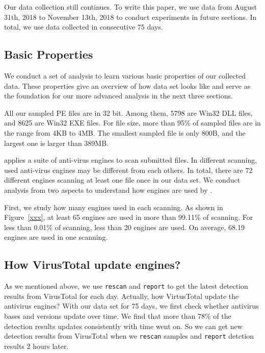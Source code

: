Our data collection still continues. 
To write this paper, we use data from August 31th, 2018 to 
November 13th, 2018 to conduct experiments in future sections. 
In total, we use data collected in consecutive 75 days. 

\subsection{Basic Properties}


We conduct a set of analysis 
to learn various basic properties of our collected data.
These properties give an overview of how data set looks like
and serve as the foundation for our more 
advanced analysis in the next three sections. 

All our sampled PE files are in 32 bit. 
Among them, 5798 are Win32 DLL files, 
and 8625 are Win32 EXE files.
For file size, more than 95\% of sampled files are 
in the range from 4KB to 4MB. 
The smallest sampled file is only 800B, 
and the largest one is larger than 389MB.


\vt{} applies a suite of anti-virus engines to scan submitted files.
In different scanning, used anti-virus engines may be different 
from each others. 
In total, there are 72 different engines scanning 
at least one file once in our data set. 
We conduct analysis from two aspects to 
understand how engines are used by \vt{}.

First, we study how many engines used in each scanning. 
As shown in Figure~\ref{xxx}, at least 65 engines are used in more 
than 99.11\% of scanning. 
For less than 0.01\% of scanning, 
less than 20 engines are used. 
On average, 68.19 engines are used in one scanning. 








\subsection{How VirusTotal update engines?}
As we mentioned above, we use \texttt{rescan} and \texttt{report} to get the latest detection results from VirusTotal for each day. Actually, how VirtusTotal update the antivirus engines? With our data set for 75 days, we first check whether antivirus bases and versions update over time. We find that more than 78\% of the detection results updates consistently with time went on. So we can get new detection results from VirusTotal when we \texttt{rescan} samples and \texttt{report} detction results 2 hours later.


